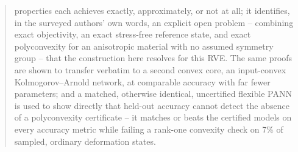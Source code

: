 \documentclass[10pt,a4paper]{article}
\begin{document}
\begin{abstract}
properties each achieves exactly, approximately, or not at all; it
identifies, in the surveyed authors' own words, an explicit open problem
-- combining exact objectivity, an exact stress-free reference state, and
exact polyconvexity for an anisotropic material with no assumed symmetry
group -- that the construction here resolves for this RVE.  The same
proofs are shown to transfer verbatim to a second convex core, an
input-convex Kolmogorov--Arnold network, at comparable accuracy with far
fewer parameters; and a matched, otherwise identical, uncertified
flexible PANN is used to show directly that held-out accuracy cannot
detect the absence of a polyconvexity certificate -- it matches or beats
the certified models on every accuracy metric while failing a rank-one
convexity check on 7\% of sampled, ordinary deformation states.
\end{abstract}

\tableofcontents
\end{document}
